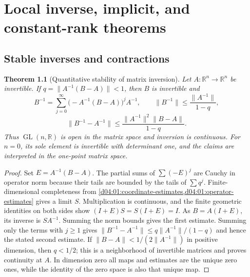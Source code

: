 \documentclass[11pt,oneside,openany]{book}
\newtheorem{theorem}{Theorem}[chapter]
\theoremstyle{definition}
\theoremstyle{remark}
\newcommand{\R}{\mathbb R}
\newcommand{\norm}[1]{\lVert#1\rVert}
\DeclareMathOperator{\GL}{GL}
\newcommand{\family}[1]{}
\begin{document}


\chapter{Local inverse, implicit, and constant-rank theorems}
\label{ch:d04-04}

\section{Stable inverses and contractions}
\family{K04.04.01}\family{K04.04.02}

\begin{theorem}[Quantitative stability of matrix inversion]\label{d04:04:inverse-stability}
Let $A:\R^n\to\R^n$ be invertible. If
$q=\norm{A^{-1}(B-A)}<1$, then $B$ is invertible and
\[
 B^{-1}=\sum_{j=0}^\infty\big(-A^{-1}(B-A)\big)^jA^{-1},\qquad
 \norm{B^{-1}}\leq\frac{\norm{A^{-1}}}{1-q},
\]
\[
 \norm{B^{-1}-A^{-1}}\leq
 \frac{\norm{A^{-1}}^2\norm{B-A}}{1-q}.
\]
Thus $\GL(n,\R)$ is open in the matrix space and inversion is continuous.
For $n=0$, its sole element is invertible with determinant one, and the
claims are interpreted in the one-point matrix space.
\end{theorem}
\begin{proof}
Set $E=A^{-1}(B-A)$. The partial sums of $\sum(-E)^j$ are Cauchy in
operator norm because their tails are bounded by the tails of $\sum q^j$.
Finite-dimensional completeness from \cref{d04:01:coordinate-estimates,d04:01:operator-estimates}
gives a limit $S$. Multiplication is continuous,
and the finite geometric identities on both sides show
$(I+E)S=S(I+E)=I$. As $B=A(I+E)$, its inverse is $SA^{-1}$.
Summing the norm bounds gives the first estimate. Summing only the terms
with $j\geq1$ gives
$\norm{B^{-1}-A^{-1}}\leq q\norm{A^{-1}}/(1-q)$ and hence the stated
second estimate. If $\norm{B-A}<1/(2\norm{A^{-1}})$ in positive dimension,
then $q<1/2$; this is a neighborhood of invertible matrices and proves
continuity at $A$. In dimension zero all maps and estimates are the unique
zero ones, while the identity of the zero space is also that unique map.
\end{proof}
\end{document}

